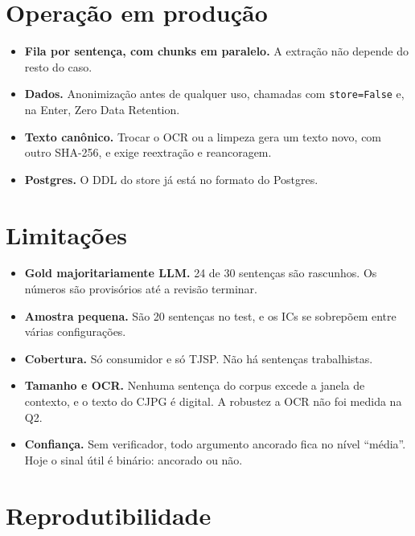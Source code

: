 \documentclass[11pt,a4paper]{article}
\begin{document}
\section{Operação em produção}
\begin{itemize}
  \item \textbf{Fila por sentença, com chunks em paralelo.} A extração não depende do resto do
    caso.
  \item \textbf{Dados.} Anonimização antes de qualquer uso, chamadas com \texttt{store=False} e,
    na Enter, Zero Data Retention.
  \item \textbf{Texto canônico.} Trocar o OCR ou a limpeza gera um texto novo, com outro
    SHA-256, e exige reextração e reancoragem.
  \item \textbf{Postgres.} O DDL do store já está no formato do Postgres.
\end{itemize}

\section{Limitações}
\begin{itemize}
  \item \textbf{Gold majoritariamente LLM.} 24 de 30 sentenças são rascunhos. Os números são
    provisórios até a revisão terminar.
  \item \textbf{Amostra pequena.} São 20 sentenças no test, e os ICs se sobrepõem entre várias
    configurações.
  \item \textbf{Cobertura.} Só consumidor e só TJSP. Não há sentenças trabalhistas.
  \item \textbf{Tamanho e OCR.} Nenhuma sentença do corpus excede a janela de contexto, e o
    texto do CJPG é digital. A robustez a OCR não foi medida na Q2.
  \item \textbf{Confiança.} Sem verificador, todo argumento ancorado fica no nível ``média''. Hoje
    o sinal útil é binário: ancorado ou não.
\end{itemize}

\section{Reprodutibilidade}
\end{document}
